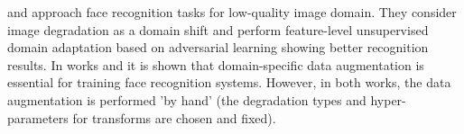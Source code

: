  \citep{HongIRY17} and
 \citep{SohnLZY0C17} approach face recognition tasks for low-quality image domain. They consider image degradation as a domain shift and perform feature-level unsupervised domain adaptation based on adversarial learning showing better recognition results. 
In works \citep{HongIRY17} and \citep{SohnLZY0C17} it is shown that domain-specific data augmentation is essential for training face recognition systems. 
 However, in both works, the data augmentation is performed 'by hand' (the degradation types and hyper-parameters for transforms are chosen and fixed).%



